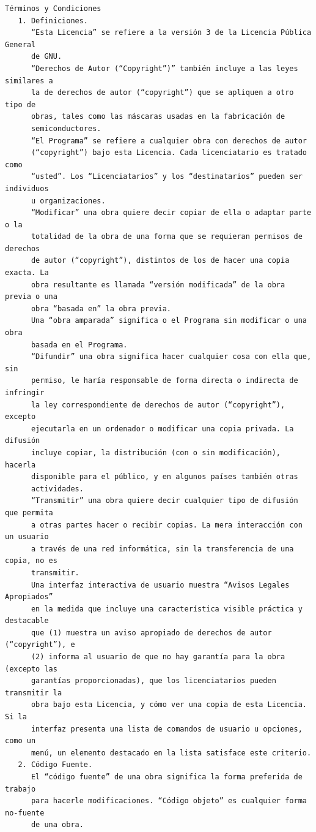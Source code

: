 \begin{verbatim}
Términos y Condiciones
   1. Definiciones.
      “Esta Licencia” se refiere a la versión 3 de la Licencia Pública General
      de GNU.
      “Derechos de Autor (“Copyright”)” también incluye a las leyes similares a
      la de derechos de autor (“copyright”) que se apliquen a otro tipo de
      obras, tales como las máscaras usadas en la fabricación de
      semiconductores.
      “El Programa” se refiere a cualquier obra con derechos de autor
      (“copyright”) bajo esta Licencia. Cada licenciatario es tratado como
      “usted”. Los “Licenciatarios” y los “destinatarios” pueden ser individuos
      u organizaciones.
      “Modificar” una obra quiere decir copiar de ella o adaptar parte o la
      totalidad de la obra de una forma que se requieran permisos de derechos
      de autor (“copyright”), distintos de los de hacer una copia exacta. La
      obra resultante es llamada “versión modificada” de la obra previa o una
      obra “basada en” la obra previa.
      Una “obra amparada” significa o el Programa sin modificar o una obra
      basada en el Programa.
      “Difundir” una obra significa hacer cualquier cosa con ella que, sin
      permiso, le haría responsable de forma directa o indirecta de infringir
      la ley correspondiente de derechos de autor (“copyright”), excepto
      ejecutarla en un ordenador o modificar una copia privada. La difusión
      incluye copiar, la distribución (con o sin modificación), hacerla
      disponible para el público, y en algunos países también otras
      actividades.
      “Transmitir” una obra quiere decir cualquier tipo de difusión que permita
      a otras partes hacer o recibir copias. La mera interacción con un usuario
      a través de una red informática, sin la transferencia de una copia, no es
      transmitir.
      Una interfaz interactiva de usuario muestra “Avisos Legales Apropiados”
      en la medida que incluye una característica visible práctica y destacable
      que (1) muestra un aviso apropiado de derechos de autor (“copyright”), e
      (2) informa al usuario de que no hay garantía para la obra (excepto las
      garantías proporcionadas), que los licenciatarios pueden transmitir la
      obra bajo esta Licencia, y cómo ver una copia de esta Licencia. Si la
      interfaz presenta una lista de comandos de usuario u opciones, como un
      menú, un elemento destacado en la lista satisface este criterio.
   2. Código Fuente.
      El “código fuente” de una obra significa la forma preferida de trabajo
      para hacerle modificaciones. “Código objeto” es cualquier forma no-fuente
      de una obra.

\end{verbatim}

